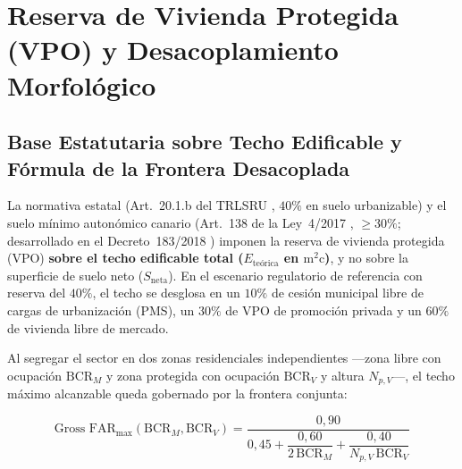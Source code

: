 \section{Reserva de Vivienda Protegida (VPO) y Desacoplamiento Morfológico}
\label{sec:vpo_mixta}

\subsection{Base Estatutaria sobre Techo Edificable y Fórmula de la Frontera Desacoplada}
\label{sub:desacoplamiento_vpo}

La normativa estatal (Art.~20.1.b del TRLSRU \cite{trlsru2015}, $40\%$ en suelo urbanizable) y el suelo mínimo autonómico canario (Art.~138 de la Ley~4/2017 \cite{ley4_2017_canarias}, $\ge 30\%$; desarrollado en el Decreto~183/2018 \cite{decreto183_2018_canarias}) imponen la reserva de vivienda protegida (VPO) \textbf{sobre el techo edificable total ($E_{\text{teórica}}$ en $\text{m}^2\text{c}$)}, y no sobre la superficie de suelo neto ($S_{\text{neta}}$). En el escenario regulatorio de referencia con reserva del $40\%$, el techo se desglosa en un $10\%$ de cesión municipal libre de cargas de urbanización (PMS), un $30\%$ de VPO de promoción privada y un $60\%$ de vivienda libre de mercado.

Al segregar el sector en dos zonas residenciales independientes ---zona libre con ocupación $\text{BCR}_M$ y zona protegida con ocupación $\text{BCR}_V$ y altura $N_{p,V}$---, el techo máximo alcanzable queda gobernado por la frontera conjunta:

\begin{equation}
\text{Gross FAR}_{\max}(\text{BCR}_M, \text{BCR}_V) = \frac{0{,}90}{0{,}45 + \dfrac{0{,}60}{2\,\text{BCR}_M} + \dfrac{0{,}40}{N_{p,V}\,\text{BCR}_V}}
\label{eq:frontera_desacoplada}
\end{equation}

